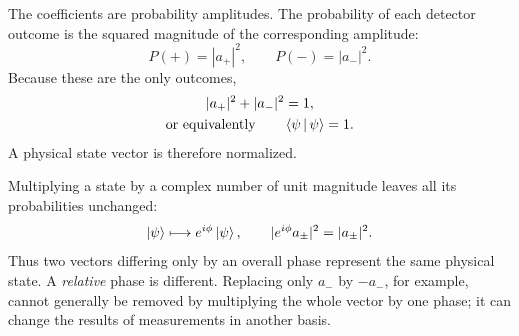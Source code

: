 The coefficients are probability amplitudes. The probability of each detector outcome is the squared magnitude of the corresponding amplitude:
\begin{equation}
  P(+)=|a_+|^2,
  \qquad
  P(-)=|a_-|^2.
  \label{eq:l02-born-rule}
\end{equation}
Because these are the only outcomes,
\begin{equation}
  \begin{gathered}
    |a_+|^2+|a_-|^2=1,\\
    \text{or equivalently}\qquad \left\langle\psi\,\middle|\,\psi\right\rangle=1.
  \end{gathered}
  \label{eq:l02-normalization}
\end{equation}
A physical state vector is therefore normalized.

\begin{classroomqa}
\end{classroomqa}

Multiplying a state by a complex number of unit magnitude leaves all its probabilities unchanged:
\begin{equation}
  \left\lvert\psi\right\rangle\longmapsto e^{i\phi}\left\lvert\psi\right\rangle,
  \qquad
  |e^{i\phi}a_\pm|^2=|a_\pm|^2.
  \label{eq:l02-global-phase}
\end{equation}
Thus two vectors differing only by an overall phase represent the same physical state. A \emph{relative} phase is different. Replacing only \(a_-\) by \(-a_-\), for example, cannot generally be removed by multiplying the whole vector by one phase; it can change the results of measurements in another basis.

\begin{classroomqa}
\end{classroomqa}

